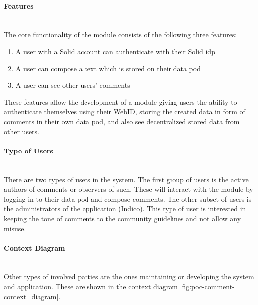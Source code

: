 \paragraph{Features}\mbox{}\\

The core functionality of the module consists of the following three features: 
\vspace{-3mm}
\begin{enumerate}
    \item A user with a Solid account can authenticate with their Solid \gls{idp}
    \item A user can compose a text which is stored on their data pod
    \item A user can see other users’ comments
\end{enumerate}
\vspace{-3mm}

These features allow the development of a module giving users the ability to authenticate themselves using their WebID, storing the created data in form of comments in their own data pod, and also see decentralized stored data from other users.
\vspace{0.5cm}
\paragraph{Type of Users}\mbox{}\\

There are two types of users in the system. The first group of users is the active authors of comments or observers of such. These will interact with the module by logging in to their data pod and compose comments. The other subset of users is the administrators of the application (Indico). This type of user is interested in keeping the tone of comments to the community guidelines and not allow any misuse.
\vspace{0.5cm}
\paragraph{Context Diagram}\mbox{}\\

Other types of involved parties are the ones maintaining or developing the system and application. These are shown in the context diagram \ref{fig:poc-comment-context_diagram}.

